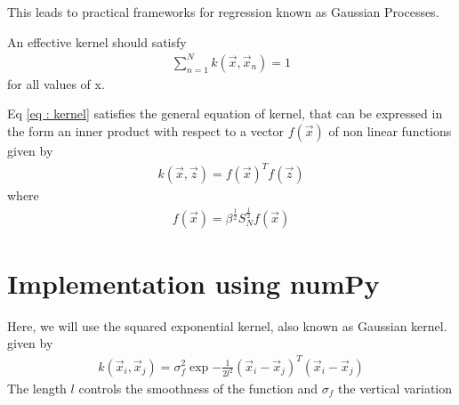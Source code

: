 \documentclass[journal,12pt,twocolumn]{IEEEtran}
\begin{document}
This leads to practical frameworks for regression known as Gaussian Processes.

An effective kernel should satisfy
\begin{align}
    \sum_{n=1}^{N} k(\vec{x},\vec{x}_{n}) = 1
\end{align}
for all values of x.

Eq \eqref{eq : kernel} satisfies the general equation of kernel, that can be expressed in the form an inner product with respect to a vector $f(\vec{x})$ of non linear functions given by
\begin{align}
      k(\vec{x},\vec{z}) = f(\vec{x})^{T}f(\vec{z})
\end{align}
where
\begin{align}
    f(\vec{x}) = \beta^{\frac{1}{2}}S_{N}^{\frac{1}{2}} f(\vec{x})
\end{align}
\section{Implementation using numPy}
Here, we will use the squared exponential kernel, also known as Gaussian kernel.
given by 
\begin{align}
    k(\vec{x}_{i},\vec{x}_{j}) = \sigma_{f}^{2} \exp{-\frac{1}{2l^2}(\vec{x}_i - \vec{x}_j)^{T}(\vec{x}_{i} - \vec{x}_{j})} \label{eq : kernel_1}
\end{align}
The length $l$ controls the smoothness of the function and $\sigma_{f}$ the vertical variation
\end{document}
